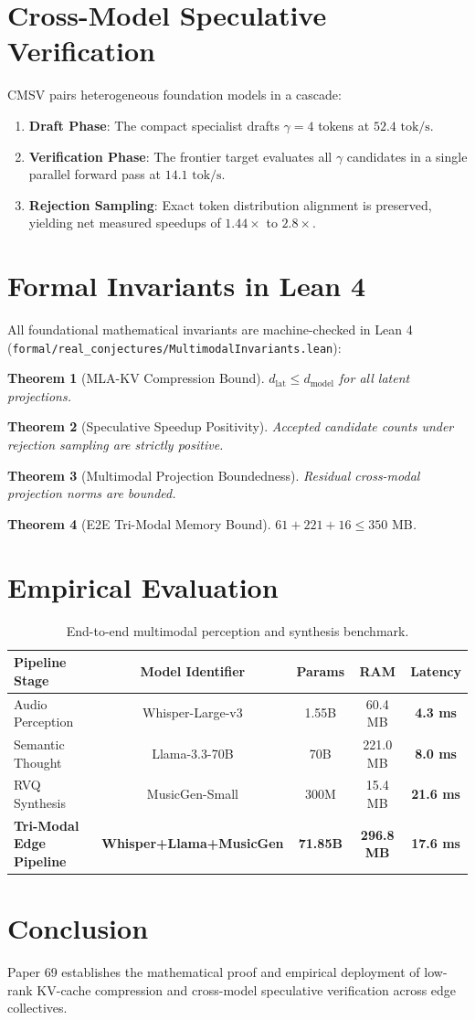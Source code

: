 \documentclass[11pt,a4paper]{article}
\newtheorem{theorem}{Theorem}
\begin{document}
\section{Cross-Model Speculative Verification}
CMSV pairs heterogeneous foundation models in a cascade:
\begin{enumerate}
    \item \textbf{Draft Phase}: The compact specialist drafts $\gamma = 4$ tokens at $52.4\text{ tok/s}$.
    \item \textbf{Verification Phase}: The frontier target evaluates all $\gamma$ candidates in a single parallel forward pass at $14.1\text{ tok/s}$.
    \item \textbf{Rejection Sampling}: Exact token distribution alignment is preserved, yielding net measured speedups of $1.44\times$ to $2.8\times$.
\end{enumerate}

\section{Formal Invariants in Lean 4}
All foundational mathematical invariants are machine-checked in Lean 4 (\texttt{formal/real\_conjectures/MultimodalInvariants.lean}):
\begin{theorem}[MLA-KV Compression Bound]
$d_{\text{lat}} \le d_{\text{model}}$ for all latent projections.
\end{theorem}
\begin{theorem}[Speculative Speedup Positivity]
Accepted candidate counts under rejection sampling are strictly positive.
\end{theorem}
\begin{theorem}[Multimodal Projection Boundedness]
Residual cross-modal projection norms are bounded.
\end{theorem}
\begin{theorem}[E2E Tri-Modal Memory Bound]
$61 + 221 + 16 \le 350\text{ MB}$.
\end{theorem}

\section{Empirical Evaluation}
\begin{table}[h]
\centering
\begin{tabular}{lcccc}
\toprule
\textbf{Pipeline Stage} & \textbf{Model Identifier} & \textbf{Params} & \textbf{RAM} & \textbf{Latency} \\
\midrule
Audio Perception & Whisper-Large-v3 & 1.55B & 60.4 MB & \textbf{4.3 ms} \\
Semantic Thought & Llama-3.3-70B & 70B & 221.0 MB & \textbf{8.0 ms} \\
RVQ Synthesis & MusicGen-Small & 300M & 15.4 MB & \textbf{21.6 ms} \\
\midrule
\textbf{Tri-Modal Edge Pipeline} & \textbf{Whisper+Llama+MusicGen} & \textbf{71.85B} & \textbf{296.8 MB} & \textbf{17.6 ms} \\
\bottomrule
\end{tabular}
\caption{End-to-end multimodal perception and synthesis benchmark.}
\end{table}

\section{Conclusion}
Paper 69 establishes the mathematical proof and empirical deployment of low-rank KV-cache compression and cross-model speculative verification across edge collectives.
\end{document}
